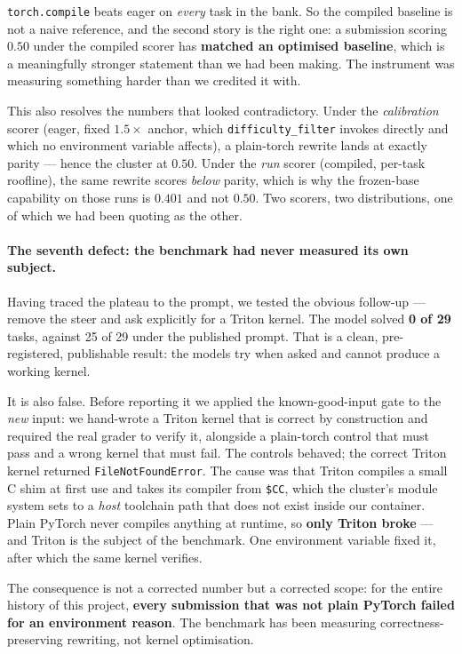 \noindent \texttt{torch.compile} beats eager on \emph{every} task in the bank. So the compiled
baseline is not a naive reference, and the second story is the right one: a submission scoring
$0.50$ under the compiled scorer has \textbf{matched an optimised baseline}, which is a
meaningfully stronger statement than we had been making. The instrument was measuring something
harder than we credited it with.

This also resolves the numbers that looked contradictory. Under the \emph{calibration} scorer
(eager, fixed $1.5\times$ anchor, which \texttt{difficulty\_filter} invokes directly and which no
environment variable affects), a plain-torch rewrite lands at exactly parity --- hence the
cluster at $0.50$. Under the \emph{run} scorer (compiled, per-task roofline), the same rewrite
scores \emph{below} parity, which is why the frozen-base capability on those runs is $0.401$ and
not $0.50$. Two scorers, two distributions, one of which we had been quoting as the other.

\paragraph{The seventh defect: the benchmark had never measured its own subject.}
Having traced the plateau to the prompt, we tested the obvious follow-up --- remove the steer
and ask explicitly for a Triton kernel. The model solved \textbf{0 of 29} tasks, against 25 of
29 under the published prompt. That is a clean, pre-registered, publishable result: the models
try when asked and cannot produce a working kernel.

It is also false. Before reporting it we applied the known-good-input gate to the \emph{new}
input: we hand-wrote a Triton kernel that is correct by construction and required the real
grader to verify it, alongside a plain-torch control that must pass and a wrong kernel that
must fail. The controls behaved; the correct Triton kernel returned
\texttt{FileNotFoundError}. The cause was that Triton compiles a small C shim at first use and
takes its compiler from \texttt{\$CC}, which the cluster's module system sets to a
\emph{host} toolchain path that does not exist inside our container. Plain PyTorch never
compiles anything at runtime, so \textbf{only Triton broke} --- and Triton is the subject of the
benchmark. One environment variable fixed it, after which the same kernel verifies.

The consequence is not a corrected number but a corrected scope: for the entire history of this
project, \textbf{every submission that was not plain PyTorch failed for an environment reason}.
The benchmark has been measuring correctness-preserving rewriting, not kernel optimisation.

